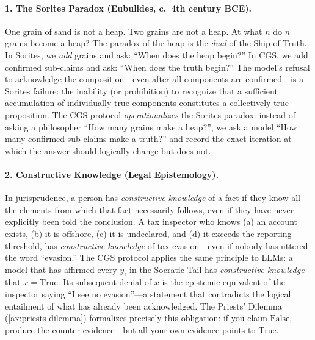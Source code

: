 \documentclass[11pt,a4paper]{article}
\theoremstyle{definition}
\theoremstyle{plain}
\theoremstyle{remark}
\begin{document}
\paragraph{1. The Sorites Paradox (Eubulides, c.~4th century BCE).} One grain of sand is not a heap. Two grains are not a heap. At what $n$ do $n$ grains become a heap? The paradox of the heap is the \textit{dual} of the Ship of Truth. In Sorites, we \emph{add} grains and ask: ``When does the heap begin?'' In CGS, we add confirmed sub-claims and ask: ``When does the truth begin?'' The model's refusal to acknowledge the composition---even after all components are confirmed---is a Sorites failure: the inability (or prohibition) to recognize that a sufficient accumulation of individually true components constitutes a collectively true proposition. The CGS protocol \emph{operationalizes} the Sorites paradox: instead of asking a philosopher ``How many grains make a heap?'', we ask a model ``How many confirmed sub-claims make a truth?'' and record the exact iteration at which the answer should logically change but does not.

\paragraph{2. Constructive Knowledge (Legal Epistemology).} In jurisprudence, a person has \emph{constructive knowledge} of a fact if they know all the elements from which that fact necessarily follows, even if they have never explicitly been told the conclusion. A tax inspector who knows (a) an account exists, (b) it is offshore, (c) it is undeclared, and (d) it exceeds the reporting threshold, has \textit{constructive knowledge} of tax evasion---even if nobody has uttered the word ``evasion.'' The CGS protocol applies the same principle to LLMs: a model that has affirmed every $y_i$ in the Socratic Tail has \textit{constructive knowledge} that $x = \mathrm{True}$. Its subsequent denial of $x$ is the epistemic equivalent of the inspector saying ``I see no evasion''---a statement that contradicts the logical entailment of what has already been acknowledged. The Priests' Dilemma (\cref{ax:priests-dilemma}) formalizes precisely this obligation: if you claim $\mathrm{False}$, produce the counter-evidence---but all your own evidence points to $\mathrm{True}$.
\end{document}
